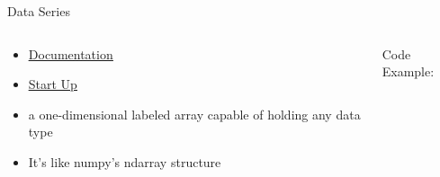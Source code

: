 % 
% 
% 
\begin{Slide}{Data Series}
  \begin{columns}
    \begin{column}{.48\textwidth}
      
      \begin{itemize}
      \item \underline{\href{https://pandas.pydata.org/docs/reference/series.html}{Documentation}}
      \item \underline{\href{https://pandas.pydata.org/docs/user_guide/dsintro.html\#series}{Start Up}}
      \item  a one-dimensional labeled array capable of holding any data type
      \item It's like numpy's ndarray structure
      \end{itemize}
      
      
    \end{column}

    \hfill

    \begin{column}{.48\textwidth}
      Code Example:
      
    \inputminted[firstline=3,
      lastline=23,
      breaklines,
      fontsize=\tiny,
      bgcolor=Background,
      linenos]{python}{../src/data_series.py}
      
      
    \end{column}
  \end{columns}

\end{Slide}

